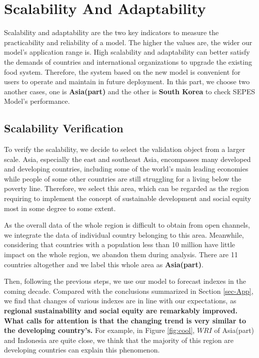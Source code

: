 \documentclass{mcmthesis}
\begin{document}
\section{Scalability And Adaptability}

Scalability and adaptability are the two key indicators to measure the practicability and reliability of a model. The higher the values are, the wider our model's application range is. High scalability and adaptability can better satisfy the demands of countries and international organizations to upgrade the existing food system. Therefore, the system based on the new model is convenient for users to operate and maintain in future deployment. In this part, we choose two another cases, one is \textbf{Asia(part)} and the other is \textbf{South Korea} to check SEPES Model's performance.

\subsection{Scalability Verification}
\label{Sec-SV}
To verify the scalability, we decide to select the validation object from a larger scale. Asia, especially the east and southeast Asia, encompasses many developed and developing countries, including some of the world's main leading economies while people of some other countries are still struggling for a living below the poverty line. Therefore, we select this area, which can be regarded as the region requiring to implement the concept of sustainable development and social equity most in some degree to some extent.

As the overall data of the whole region is difficult to obtain from open channels, we integrate the data of individual country belonging to this area. Meanwhile, considering that countries with a population less than 10 million have little impact on the whole region, we abandon them during analysis. There are 11 countries altogether and we label this whole area as \textbf{Asia(part)}.

Then, following the previous steps, we use our model to forecast  indexes in the coming decade. Compared with the conclusions summarized in Section \ref{sec-App}, we find that changes of various indexes are in line with our expectations, as \textbf{regional sustainability and social equity are remarkably improved. What calls for attention is that the changing trend is very similar to the developing country's. }For example, in Figure \ref{fig:cool}, $WRI$ of Asia(part) and Indonesia are quite close, we think that the majority of this region are developing countries can explain this phenomenon.
\end{document}
